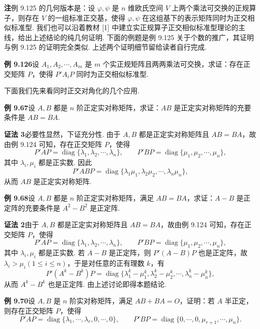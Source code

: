 \documentclass[UTF8,12pt,a4paper,fontset=fandol]{ctexart}
\begin{document}
\noindent\textbf{注}\quad 例 9.125 的几何版本是：设 $\varphi,\psi$ 是 $n$ 维欧氏空间 $V$ 上两个乘法可交换的正规算子，则存在 $V$ 的一组标准正交基，使得 $\varphi,\psi$ 在这组基下的表示矩阵同时为正交相似标准型. 我们也可以沿着教材 [1] 中建立实正规算子正交相似标准型理论的主线，给出上述结论的纯几何证明. 下面的例题是例 9.125 关于个数的推广，其证明与例 9.125 的证明完全类似. 上述两个证明细节留给读者自行完成.

\noindent\textbf{例 9.126}\quad 设 $A_1,A_2,\cdots,A_m$ 是 $m$ 个实正规矩阵且两两乘法可交换，求证：存在正交矩阵 $P$，使得 $P'A_iP$ 同时为正交相似标准型.

下面我们先来看同时正交对角化的几个应用.

\noindent\textbf{例 9.67}\quad 设 $A,B$ 都是 $n$ 阶正定实对称矩阵，求证：$AB$ 是正定实对称矩阵的充要条件是 $AB=BA$.

\noindent\textbf{证法 3}\quad 必要性显然，下证充分性. 由于 $A,B$ 都是正定实对称矩阵且 $AB=BA$，故由例 9.124 可知，存在正交矩阵 $P$，使得
\[
P'AP=\operatorname{diag}\{\lambda_1,\lambda_2,\cdots,\lambda_n\},\qquad
P'BP=\operatorname{diag}\{\mu_1,\mu_2,\cdots,\mu_n\},
\]
其中 $\lambda_i,\mu_i$ 都是正实数. 因此
\[
P'ABP=\operatorname{diag}\{\lambda_1\mu_1,\lambda_2\mu_2,\cdots,\lambda_n\mu_n\},
\]
从而 $AB$ 是正定实对称矩阵.

\noindent\textbf{例 9.68}\quad 设 $A,B$ 都是 $n$ 阶正定实对称矩阵，满足 $AB=BA$，求证：$A-B$ 是正定阵的充要条件是 $A^2-B^2$ 是正定阵.

\noindent\textbf{证法 2}\quad 由于 $A,B$ 都是正定实对称矩阵且 $AB=BA$，故由例 9.124 可知，存在正交矩阵 $P$，使得
\[
P'AP=\operatorname{diag}\{\lambda_1,\lambda_2,\cdots,\lambda_n\},\qquad
P'BP=\operatorname{diag}\{\mu_1,\mu_2,\cdots,\mu_n\},
\]
其中 $\lambda_i,\mu_i$ 都是正实数. 若 $A-B$ 是正定阵，则 $P'(A-B)P$ 也是正定阵，故 $\lambda_i>\mu_i(1\le i\le n)$，于是对任意的正有理数 $k$，有
\[
P'(A^k-B^k)P=\operatorname{diag}\{\lambda_1^k-\mu_1^k,\lambda_2^k-\mu_2^k,\cdots,\lambda_n^k-\mu_n^k\},
\]
从而 $A^k-B^k$ 也是正定阵. 由上述讨论即得本题结论.

\noindent\textbf{例 9.70}\quad 设 $A,B$ 是 $n$ 阶实对称矩阵，满足 $AB+BA=O$，证明：若 $A$ 半正定，则存在正交矩阵 $P$，使得
\[
P'AP=\operatorname{diag}\{\lambda_1,\cdots,\lambda_r,0,\cdots,0\},\qquad
P'BP=\operatorname{diag}\{0,\cdots,0,\mu_{r+1},\cdots,\mu_n\}.
\]
\end{document}
